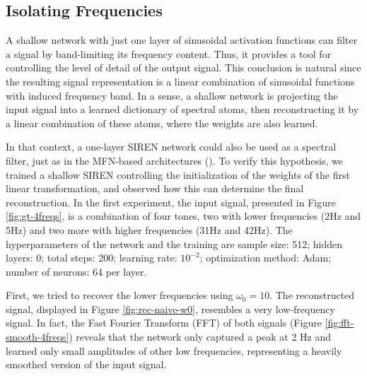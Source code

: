 \subsection{Isolating Frequencies}

A shallow network with just one layer of sinusoidal activation functions can filter a signal by band-limiting its frequency content. Thus, it provides a tool for controlling the level of detail of the output signal. This conclusion is natural since the resulting signal representation is a linear combination of sinusoidal functions with induced frequency band. In a sense, a shallow network is projecting the input signal into a learned dictionary of spectral atoms, then reconstructing it by a linear combination of these atoms, where the weights are also learned.

In that context, a one-layer SIREN network could also be used as a spectral filter, just as in the MFN-based architectures (\cite{fathony2020multiplicative}). To verify this hypothesis, we trained a shallow SIREN controlling the initialization of the weights of the first linear transformation, and observed how this can determine the final reconstruction. In the first experiment, the input signal, presented in Figure \ref{fig:gt-4freqs}, is a combination of four tones, two with lower frequencies (2Hz and 5Hz) and two more with higher frequencies (31Hz and 42Hz). The hyperparameters of the network and the training are sample size: 512; hidden layers: 0; total steps: 200; learning rate: $10^{-2}$; optimization method: Adam; number of neurons: 64 per layer. 

First, we tried to recover the lower frequencies using $\omega_0=10$. The reconstructed signal, displayed in Figure \ref{fig:rec-naive-w0}, resembles a very low-frequency signal. In fact, the Fast Fourier Transform (FFT) of both signals (Figure \ref{fig:fft-smooth-4freqs}) reveals that the network only captured a peak at 2 Hz and learned only small amplitudes of other low frequencies, representing a heavily smoothed version of the input signal.


